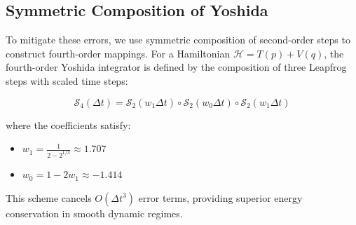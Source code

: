 \documentclass[12pt,a4paper]{article}
\newcommand{\cH}{\mathcal{H}}
\newcommand{\cS}{\mathcal{S}}
\begin{document}
\subsection{Symmetric Composition of Yoshida}

To mitigate these errors, we use symmetric composition of second-order steps to construct fourth-order mappings. For a Hamiltonian $\cH = T(p) + V(q)$, the fourth-order Yoshida integrator is defined by the composition of three Leapfrog steps with scaled time steps:

\begin{equation}
\cS_4(\Delta t) = \cS_2(w_1 \Delta t) \circ \cS_2(w_0 \Delta t) \circ \cS_2(w_1 \Delta t)
\end{equation}

where the coefficients satisfy:
\begin{itemize}[leftmargin=1.5cm]
\item $w_1 = \frac{1}{2 - 2^{1/3}} \approx 1.707$
\item $w_0 = 1 - 2w_1 \approx -1.414$
\end{itemize}

This scheme cancels $O(\Delta t^3)$ error terms, providing superior energy conservation in smooth dynamic regimes.
\end{document}
